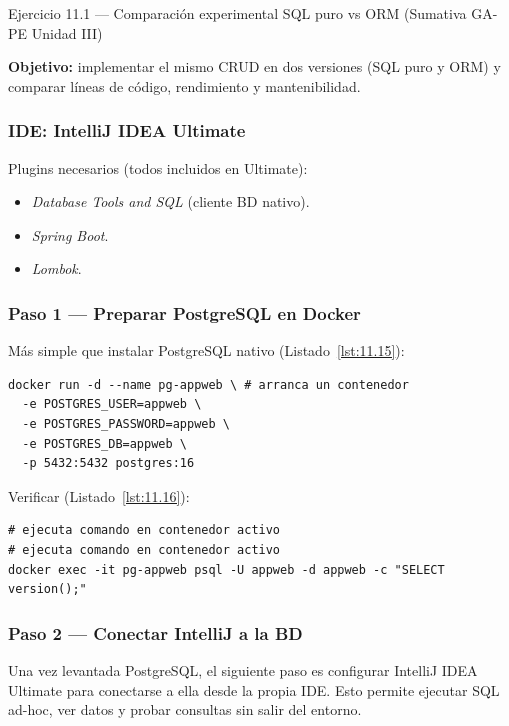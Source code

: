 \begin{cajaejercicio}{Ejercicio 11.1 --- Comparación experimental SQL puro vs ORM (Sumativa GA-PE Unidad III)}

\textbf{Objetivo:} implementar el mismo CRUD en dos versiones (SQL
puro y ORM) y comparar líneas de código, rendimiento y mantenibilidad.

\subsubsection*{IDE: IntelliJ IDEA Ultimate}
Plugins necesarios (todos incluidos en Ultimate):
\begin{itemize}
\item \emph{Database Tools and SQL} (cliente BD nativo).
\item \emph{Spring Boot}.
\item \emph{Lombok}.
\end{itemize}

\subsubsection*{Paso 1 --- Preparar PostgreSQL en Docker}

Más simple que instalar PostgreSQL nativo (Listado~\ref{lst:11.15}):
\begin{lstlisting}[style=shell,numbers=none,caption={Ejemplo de Shell},label=lst:11.15]
docker run -d --name pg-appweb \ # arranca un contenedor
  -e POSTGRES_USER=appweb \
  -e POSTGRES_PASSWORD=appweb \
  -e POSTGRES_DB=appweb \
  -p 5432:5432 postgres:16
\end{lstlisting}

Verificar (Listado~\ref{lst:11.16}):
\begin{lstlisting}[style=shell,numbers=none,caption={Ejemplo de Shell},label=lst:11.16]
# ejecuta comando en contenedor activo
# ejecuta comando en contenedor activo
docker exec -it pg-appweb psql -U appweb -d appweb -c "SELECT version();"
\end{lstlisting}

\subsubsection*{Paso 2 --- Conectar IntelliJ a la BD}

Una vez levantada PostgreSQL, el siguiente paso es configurar
IntelliJ IDEA Ultimate para conectarse a ella desde la propia IDE.
Esto permite ejecutar SQL ad-hoc, ver datos y probar consultas sin
salir del entorno.



\end{cajaejercicio}
